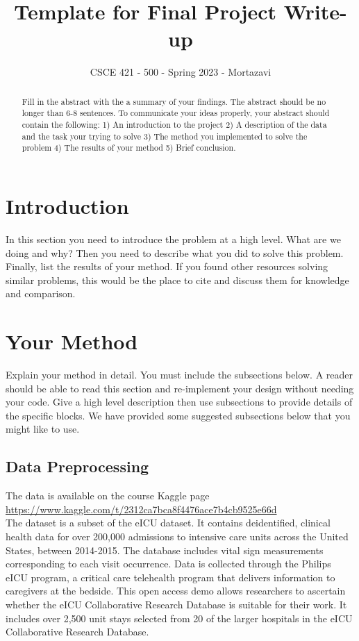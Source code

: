 \documentclass{article}
\title{Template for Final Project Write-up}
\author{%
  CSCE 421 - 500 - Spring 2023 - Mortazavi
}
\begin{document}
\maketitle


\begin{abstract}
  Fill in the abstract with the a summary of your findings. The abstract should be no longer than 6-8 sentences. To communicate your ideas properly, your abstract should contain the following: 1) An introduction to the project 2) A description of the data and the task your trying to solve 3) The method you implemented to solve the problem 4) The results of your method 5) Brief conclusion.
\end{abstract}


\section{Introduction}

In this section you need to introduce the problem at a high level. What are we doing and why? Then you need to describe what you did to solve this problem. Finally, list the results of your method. If you found other resources solving similar problems, this would be the place to cite and discuss them for knowledge and comparison.

\section{Your Method}

Explain your method in detail. You must include the subsections below. A reader should be able to read this section and re-implement your design without needing your code. Give a high level description then use subsections to provide details of the specific blocks. We have provided some suggested subsections below that you might like to use.

\subsection{Data Preprocessing}

The data is available on the course Kaggle page \\\href{https://www.kaggle.com/t/2312ca7bca8f4476ace7b4cb9525e66d}{https://www.kaggle.com/t/2312ca7bca8f4476ace7b4cb9525e66d} \\
The dataset is a subset of the eICU dataset. It contains deidentified, clinical health data for over 200,000 admissions to intensive care units across the United States, between 2014-2015. The database includes vital sign measurements corresponding to each visit occurrence. Data is collected through the Philips eICU program, a critical care telehealth program that delivers information to caregivers at the bedside. This open access demo allows researchers to ascertain whether the eICU Collaborative Research Database is suitable for their work. It includes over 2,500 unit stays selected from 20 of the larger hospitals in the eICU Collaborative Research Database.
\end{document}
